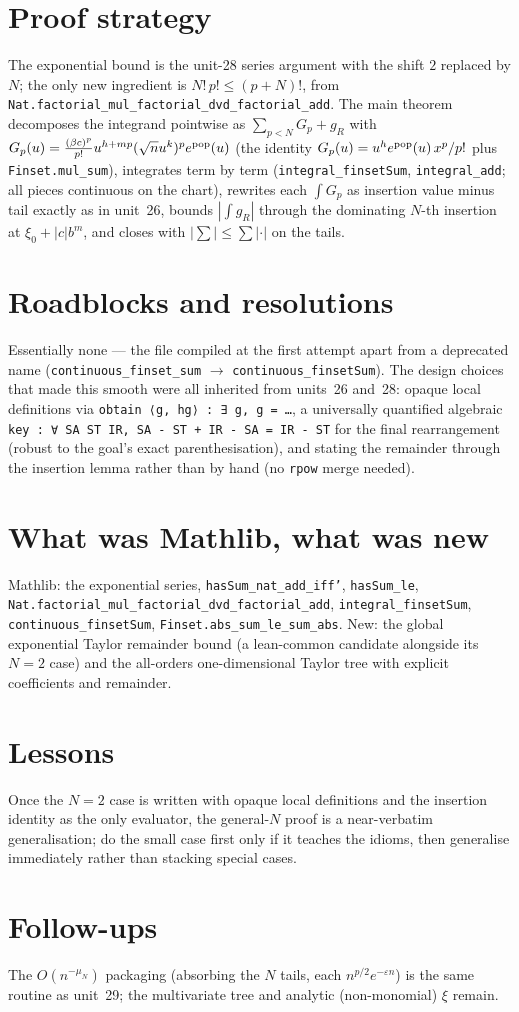 \documentclass[11pt]{article}
\begin{document}
\section{Proof strategy}
The exponential bound is the unit-28 series argument with the shift $2$ replaced by $N$; the only new
ingredient is $N!\,p!\le(p+N)!$, from \texttt{Nat.factorial\_mul\_factorial\_dvd\_factorial\_add}. The
main theorem decomposes the integrand pointwise as $\sum_{p<N}G_p+g_R$ with
$G_p(u)=\frac{(\beta c)^p}{p!}u^{h+mp}(\sqrt nu^k)^p e^{\rm pop}(u)$ (the identity
$G_p(u)=u^he^{\rm pop}(u)\,x^p/p!$ plus \texttt{Finset.mul\_sum}), integrates term by term
(\texttt{integral\_finsetSum}, \texttt{integral\_add}; all pieces continuous on the chart), rewrites each
$\int G_p$ as insertion value minus tail exactly as in unit~26, bounds $|\int g_R|$ through the
dominating $N$-th insertion at $\xi_0+|c|b^m$, and closes with $|\sum|\le\sum|\cdot|$ on the tails.

\section{Roadblocks and resolutions}
Essentially none --- the file compiled at the first attempt apart from a deprecated name
(\texttt{continuous\_finset\_sum} $\to$ \texttt{continuous\_finsetSum}). The design choices that made this
smooth were all inherited from units~26 and~28: opaque local definitions via
\texttt{obtain ⟨g, hg⟩ : ∃ g, g = \dots}, a universally quantified algebraic
\texttt{key : ∀ SA ST IR, SA - ST + IR - SA = IR - ST} for the final rearrangement (robust to the goal's
exact parenthesisation), and stating the remainder through the insertion lemma rather than by hand
(no \texttt{rpow} merge needed).

\section{What was Mathlib, what was new}
Mathlib: the exponential series, \texttt{hasSum\_nat\_add\_iff'}, \texttt{hasSum\_le},
\texttt{Nat.factorial\_mul\_factorial\_dvd\_factorial\_add}, \texttt{integral\_finsetSum},
\texttt{continuous\_finsetSum}, \texttt{Finset.abs\_sum\_le\_sum\_abs}. New: the global exponential
Taylor remainder bound (a lean-common candidate alongside its $N=2$ case) and the all-orders
one-dimensional Taylor tree with explicit coefficients and remainder.

\section{Lessons}
Once the $N=2$ case is written with opaque local definitions and the insertion identity as the only
evaluator, the general-$N$ proof is a near-verbatim generalisation; do the small case first only if it
teaches the idioms, then generalise immediately rather than stacking special cases.

\section{Follow-ups}
The $O(n^{-\mu_N})$ packaging (absorbing the $N$ tails, each $n^{p/2}e^{-\varepsilon n}$) is the same
routine as unit~29; the multivariate tree and analytic (non-monomial) $\xi$ remain.
\end{document}
